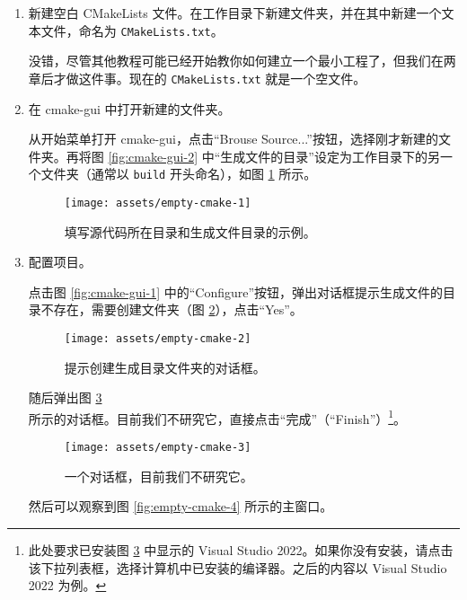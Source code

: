 \begin{enumerate}
	\item 新建空白 CMakeLists 文件。在工作目录下新建文件夹，并在其中新建一个文本文件，命名为 \lstinline[language={}]{CMakeLists.txt}。

	\begin{note}
		没错，尽管其他教程可能已经开始教你如何建立一个最小工程了，但我们在两章后才做这件事。现在的 \lstinline[language={}]{CMakeLists.txt} 就是一个空文件。
	\end{note}

	\item 在 cmake-gui 中打开新建的文件夹。\label{item:exp-3-2}

	从开始菜单打开 cmake-gui，点击“Brouse Source...”按钮，选择刚才新建的文件夹。再将图 \ref{fig:cmake-gui-2} 中“生成文件的目录”设定为工作目录下的另一个文件夹（通常以 \lstinline[language={}]{build} 开头命名），如图 \ref{fig:empty-cmake-1} 所示。

	\begin{figure}[H]
		\centering
		\texttt{[image: assets/empty-cmake-1]}
		\caption{填写源代码所在目录和生成文件目录的示例。}
		\label{fig:empty-cmake-1}
	\end{figure}

	\item 配置项目。\label{item:exp-3-3}

	点击图 \ref{fig:cmake-gui-1} 中的“Configure”按钮，弹出对话框提示生成文件的目录不存在，需要创建文件夹（图 \ref{fig:empty-cmake-2}），点击“Yes”。

	\begin{figure}[H]
		\centering
		\texttt{[image: assets/empty-cmake-2]}
		\caption{提示创建生成目录文件夹的对话框。}
		\label{fig:empty-cmake-2}
	\end{figure}

	随后弹出图 \ref{fig:empty-cmake-3} 所示的对话框。目前我们不研究它，直接点击“完成”（“Finish”）\footnote{此处要求已安装图 \ref{fig:empty-cmake-3} 中显示的 Visual Studio 2022。如果你没有安装，请点击该下拉列表框，选择计算机中已安装的编译器。之后的内容以 Visual Studio 2022 为例。}。

	\begin{figure}[H]
		\centering
		\texttt{[image: assets/empty-cmake-3]}
		\caption{一个对话框，目前我们不研究它。}
		\label{fig:empty-cmake-3}
	\end{figure}

	然后可以观察到图 \ref{fig:empty-cmake-4} 所示的主窗口。


\end{enumerate}
